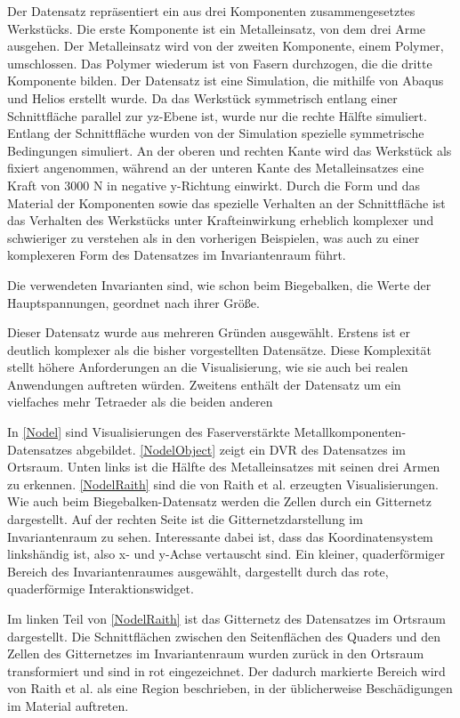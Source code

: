 \documentclass[a4paper,fontsize=12pt,toc=bib,halfparskip,ngerman]{scrartcl}
\begin{document}
Der Datensatz repr\"asentiert ein aus drei Komponenten zusammengesetztes Werkst\"ucks. Die erste Komponente ist ein Metalleinsatz, von dem drei Arme ausgehen. Der Metalleinsatz wird von der zweiten Komponente, einem Polymer, umschlossen. Das Polymer wiederum ist von Fasern durchzogen, die die dritte Komponente bilden. Der Datensatz ist eine Simulation, die mithilfe von Abaqus\cite{abaqusWebsite} und Helios\cite{heliosWebsite} erstellt wurde. Da das Werkst\"uck symmetrisch entlang einer Schnittfl\"ache parallel zur yz-Ebene ist, wurde nur die rechte H\"alfte simuliert. Entlang der Schnittfl\"ache wurden von der Simulation spezielle symmetrische Bedingungen simuliert. An der oberen und rechten Kante wird das Werkst\"uck als fixiert angenommen, w\"ahrend an der unteren Kante des Metalleinsatzes eine Kraft von 3000 N in negative y-Richtung einwirkt. Durch die Form und das Material der Komponenten sowie das spezielle Verhalten an der Schnittfl\"ache ist das Verhalten des Werkst\"ucks unter Krafteinwirkung erheblich komplexer und schwieriger zu verstehen als in den vorherigen Beispielen, was auch zu einer komplexeren Form des Datensatzes im Invariantenraum f\"uhrt. 

Die verwendeten Invarianten sind, wie schon beim Biegebalken, die Werte der Hauptspannungen, geordnet nach ihrer Gr\"o{\ss}e.

Dieser Datensatz wurde aus mehreren Gr\"unden ausgew\"ahlt. Erstens ist er deutlich komplexer als die bisher vorgestellten Datens\"atze. Diese Komplexit\"at stellt h\"ohere Anforderungen an die Visualisierung, wie sie auch bei realen Anwendungen auftreten w\"urden. Zweitens enth\"alt der Datensatz um ein vielfaches mehr Tetraeder als die beiden anderen

In \cref{Nodel} sind Visualisierungen des Faserverst\"arkte Metallkomponenten-Datensatzes abgebildet. \cref{NodelObject} zeigt ein DVR des Datensatzes im Ortsraum. Unten links ist die H\"alfte des Metalleinsatzes mit seinen drei Armen zu erkennen. \cref{NodelRaith} sind die von Raith et al. erzeugten Visualisierungen. Wie auch beim Biegebalken-Datensatz werden die Zellen durch ein Gitternetz dargestellt. Auf der rechten Seite ist die Gitternetzdarstellung im Invariantenraum zu sehen. Interessante dabei ist, dass das Koordinatensystem linksh\"andig ist, also x- und y-Achse vertauscht sind. Ein kleiner, quaderf\"ormiger Bereich des Invariantenraumes ausgew\"ahlt, dargestellt durch das rote, quaderf\"ormige Interaktionswidget. 

Im linken Teil von \cref{NodelRaith} ist das Gitternetz des Datensatzes im Ortsraum dargestellt. Die Schnittfl\"achen zwischen den Seitenfl\"achen des Quaders und den Zellen des Gitternetzes im Invariantenraum wurden zur\"uck in den Ortsraum transformiert und sind in rot eingezeichnet. Der dadurch markierte Bereich wird von Raith et al. als eine Region beschrieben, in der \"ublicherweise Besch\"adigungen im Material auftreten.
\end{document}
